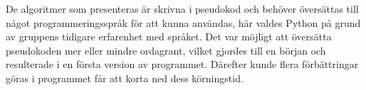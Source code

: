 
De algoritmer som presenteras \cite{HaraldSieve} är skrivna i pseudokod och behöver översättas till något programmeringsspråk för att kunna användas, här valdes Python på grund av gruppens tidigare erfarenhet med språket. Det var möjligt att översätta pseudokoden mer eller mindre ordagrant, vilket gjordes till en början och resulterade i en första version av programmet. Därefter kunde flera förbättringar göras i programmet får att korta ned dess körningstid. 


